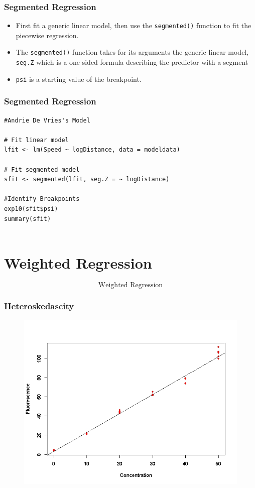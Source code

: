 \documentclass{beamer}
\begin{document}
\begin{frame}
	\frametitle{Segmented Regression}
	\large
\begin{itemize}
\item First fit a generic linear model, then use the \texttt{segmented()} function to fit the piecewise regression.
\item  The \texttt{segmented()} function takes for its arguments the generic linear model, \texttt{seg.Z} which is a one sided formula describing the predictor with a segment 
\item \texttt{psi} is a starting value of the breakpoint. 
\end{itemize}
\end{frame}
\begin{frame}[fragile]
\frametitle{Segmented Regression}
\large
\begin{framed}
	\begin{verbatim}
#Andrie De Vries's Model

# Fit linear model
lfit <- lm(Speed ~ logDistance, data = modeldata)

# Fit segmented model
sfit <- segmented(lfit, seg.Z = ~ logDistance)

#Identify Breakpoints
exp10(sfit$psi)
summary(sfit)
	
	\end{verbatim}
	\end{framed}
\end{frame}


\section{Weighted Regression}
\begin{frame}
	\LARGE
	\[\mbox{Weighted Regression}\]
\end{frame}
\begin{frame}
	\frametitle{Heteroskedascity}
	\large
	\begin{figure}
		\centering
		\includegraphics[width=1.0\linewidth]{images/ExamQ2plot2}
	\end{figure}
	
\end{frame}
\end{document}
